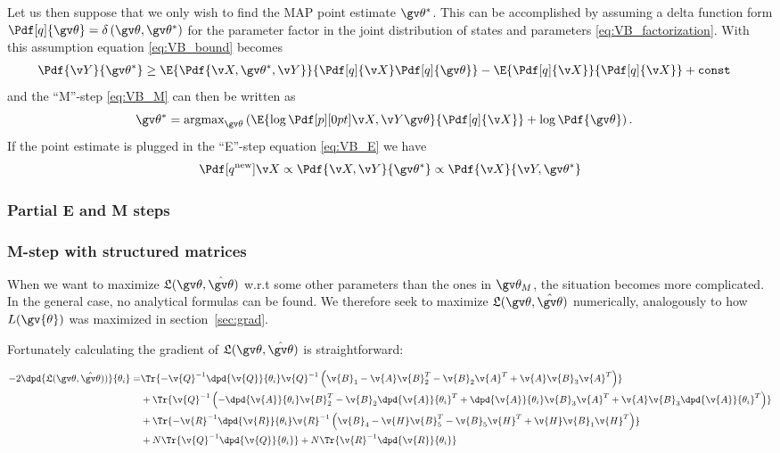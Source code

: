 Let us then suppose that we only wish to find the MAP point estimate $\Th^*$. This can be accomplished
by assuming a delta function form $\Pdf[q]{\Th}=\delta\left(\Th,\Th^*\right)$ for the parameter factor in the
joint distribution of states and parameters \eqref{eq:VB_factorization}.
With this assumption equation \eqref{eq:VB_bound} becomes
\begin{align}
	\Pdf{\Y}{\Th^*} &\geq \E{\Pdf{\X,\Th^*,\Y}}{\Pdf[q]{\X}\Pdf[q]{\Th}} - \E{\Pdf[q]{\X}}{\Pdf[q]{\X}} + \mathtt{const}
	\label{eq:VB_MAP_boundl}
\end{align}
and the ``M''-step \eqref{eq:VB_M} can then be written as
\begin{align}
	\Th^* &= \text{argmax}_{\Th}\left(\E{\log\cLH}{\Pdf[q]{\X}}+\log\Pdf{\Th}\right).
	\label{tablelabel}
\end{align}
If the point estimate is plugged in the ``E''-step equation \eqref{eq:VB_E} we have
\begin{align}
	\Pdf[q^{\text{new}}]{\X}\propto \Pdf{\X,\Y}{\Th^*} \propto \Pdf{\X}{\Y,\Th^*} 
	\label{tablelabel}
\end{align}

\subsubsection{Partial E and M steps}




\subsubsection{M-step with structured matrices}
\cite{Wills2011}
When we want to maximize $\Lb(\Th,\hat{\Th})$ w.r.t some other
parameters than the ones in $\Th_M$, the situation becomes more complicated.
In the general case, no analytical formulas can be found. We therefore seek
to maximize $\Lb(\Th,\hat{\Th})$ numerically, analogously to how $L(\gv{\theta})$
was maximized in section~\ref{sec:grad}.

Fortunately calculating the gradient of $\Lb(\Th,\hat{\Th})$ is straightforward:

\begin{align}
\begin{split}
	-2\dpd{\Lb(\Th,\hat{\Th}))}{\theta_i}
	=&\Tr{-\v{Q}^{-1}\dpd{\v{Q}}{\theta_i}\v{Q}^{-1}
	\left(\v{B}_1-\v{A}\v{B}_2^T-\v{B}_2\v{A}^T+\v{A}\v{B}_3\v{A}^T\right)}\\
	&+\Tr{\v{Q}^{-1}\left(-\dpd{\v{A}}{\theta_i}\v{B}_2^T-\v{B}_2\dpd{\v{A}}{\theta_i}^T+\dpd{\v{A}}{\theta_i}\v{B}_3\v{A}^T+\v{A}\v{B}_3\dpd{\v{A}}{\theta_i}^T\right)}\\
	&+\Tr{-\v{R}^{-1}\dpd{\v{R}}{\theta_i}\v{R}^{-1}
	\left(\v{B}_4-\v{H}\v{B}_5^T-\v{B}_5\v{H}^T+\v{H}\v{B}_1\v{H}^T\right)}\\
	&+N\Tr{\v{Q}^{-1}\dpd{\v{Q}}{\theta_i}}
	+N\Tr{\v{R}^{-1}\dpd{\v{R}}{\theta_i}}\\
	\label{eq:dLB}
\end{split}
\end{align}



